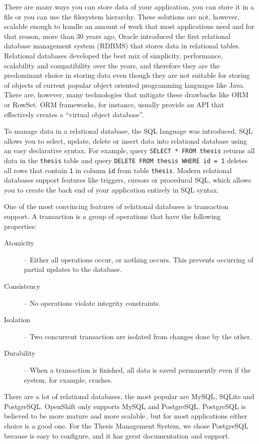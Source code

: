 There are many ways you can store data of your application, you can store it in a file or you can use the filesystem hierarchy. These solutions are not, however, scalable enough to handle an amount of work that most applications need and for that reason, more than 30 years ago, Oracle introduced the first relational database management system (RDBMS) that stores data in relational tables. Relational databases developed the best mix of simplicity, performance, scalability and compatibility over the years, and therefore they are the predominant choice in storing data even though they are not suitable for storing of objects of current popular object oriented programming languages like Java. There are, however, many technologies that mitigate these drawbacks like ORM or RowSet. ORM frameworks, for instance, usually provide an API that effectively creates a ``virtual object database''.

To manage data in a relational database, the SQL language was introduced. SQL allows you to select, update, delete or insert data into relational database using an easy declarative syntax. For example, query \texttt{SELECT * FROM thesis} returns all data in the \texttt{thesis} table and query \texttt{DELETE FROM thesis WHERE id = 1} deletes all rows that contain \texttt{1} in column \texttt{id} from table \texttt{thesis}. Modern relational databases support features like triggers, cursors or procedural SQL, which allows you to create the back end of your application entirely in SQL syntax.

One of the most convincing features of relational databases is transaction support. A transaction is a group of operations that have the following properties:

\begin{description}
    \item[Atomicity] -- Either all operations occur, or nothing occurs. This prevents occurring of partial updates to the database.
    \item[Consistency] -- No operations violate integrity constraints.
    \item[Isolation] -- Two concurrent transaction are isolated from changes done by the other.
    \item[Durability] -- When a transaction is finished, all data is saved permanently even if the system, for example, crashes.
\end{description}

There are a lot of relational databases, the most popular are MySQL, SQLite and PostgreSQL. OpenShift only supports MySQL and PostgreSQL. PostgreSQL is believed to be more mature and more scalable\,\cite{mysql-vs-psql}, but for most applications either choice is a good one. For the Thesis Management System, we chose PostgreSQL because is easy to configure, and it has great documentation and support.

